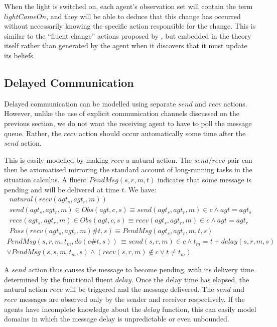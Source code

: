 When the light is switched on, each agent's observation set will contain
the term $lightCameOn$, and they will be able to deduce that this
change has occurred without necessarily knowing the specific action
responsible for the change. This is similar to the {}``fluent change''
actions proposed by \citet{degiacomo98execution_monitoring}, but
embedded in the theory itself rather than generated by the agent when
it discovers that it must update its beliefs.


\subsection{Delayed Communication\label{sec:Observations:Delayed}}

Delayed communication can be modelled using separate $send$ and $recv$
actions. However, unlike the use of explicit communication channels
discussed on the previous section, we do not want the receiving agent
to have to poll the message queue. Rather, the $recv$ action should
occur automatically some time after the $send$ action.

This is easily modelled by making $recv$ a natural action. The $send/recv$
pair can then be axiomatised mirroring the standard account of long-running
tasks in the situation calculus. A fluent $PendMsg(s,r,m,t)$ indicates
that some message is pending and will be delivered at time $t$. We
have:\begin{gather*}
natural(recv(agt_{s},agt_{r},m))\\
send(agt_{s},agt_{r},m)\in Obs(agt,c,s)\equiv send(agt_{s},agt_{r},m)\in c\wedge agt=agt_{s}\\
recv(agt_{s},agt_{r},m)\in Obs(agt,c,s)\equiv recv(agt_{s},agt_{r},m)\in c\wedge agt=agt_{r}\\
Poss(recv(agt_{s},agt_{r},m)\#t,s)\equiv PendMsg(agt_{s},agt_{r},m,t,s)\end{gather*}
 \begin{multline*}
PendMsg(s,r,m,t_{m},do(c\#t,s))\,\equiv send(s,r,m)\in c\wedge t_{m}=t+delay(s,r,m,s)\\
\vee PendMsg(s,s,m,t_{m},s)\wedge\left(recv(s,r,m)\not\in c\vee t\neq t_{m}\right)\end{multline*}


A $send$ action thus causes the message to become pending, with its
delivery time determined by the functional fluent $delay$. Once the
delay time has elapsed, the natural action $recv$ will be triggered
and the message delivered. The $send$ and $recv$ messages are observed
only by the sender and receiver respectively. If the agents have incomplete
knowledge about the $delay$ function, this can easily model domains
in which the message delay is unpredictable or even unbounded.


